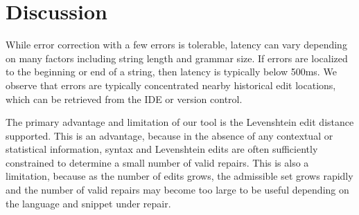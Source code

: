 \documentclass[sigplan,review,anonymous,acmsmall]{acmart}\settopmatter{printfolios=false,printccs=false,printacmref=false}
\begin{document}
%
%
%
%
%
%

\section{Discussion}\label{sec:discussion}

While error correction with a few errors is tolerable, latency can vary depending on many factors including string length and grammar size. If errors are localized to the beginning or end of a string, then latency is typically below 500ms. We observe that errors are typically concentrated nearby historical edit locations, which can be retrieved from the IDE or version control.

The primary advantage and limitation of our tool is the Levenshtein edit distance supported. This is an advantage, because in the absence of any contextual or statistical information, syntax and Levenshtein edits are often sufficiently constrained to determine a small number of valid repairs. This is also a limitation, because as the number of edits grows, the admissible set grows rapidly and the number of valid repairs may become too large to be useful depending on the language and snippet under repair.
\end{document}
